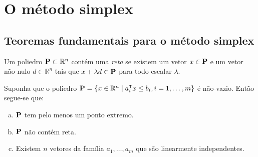 \section{O método simplex}\label{sec:metodo_simplex}
\subsection{Teoremas fundamentais para o método simplex}\label{sec:simplex pontos extremos}

\begin{mydef}[Reta]\label{def:reta}
Um poliedro $\vb P \subset \mathbb{R}^n$ contém uma \emph{reta} se existem um vetor $x \in \vb P$ e um vetor não-nulo $ d \in \mathbb{R}^n$ tais que $x + \lambda d \in \vb P$ para todo escalar $\lambda$.
\end{mydef}

\begin{theorem}\label{teo:retas}
    Suponha que o poliedro ${\vb P = \{x \in \mathbb{R}^n \mid a_i^\intercal x \leq b_i, i = 1,\ldots,m\}}$ é não-vazio. Então segue-se que:
    \begin{enumerate}[(a)]
    \item $\vb P$ tem pelo menos um ponto extremo.
    \item $\vb P$ não contém reta.
    \item Existem $n$ vetores da família $a_1,\ldots,a_m$ que são linearmente independentes.
    \end{enumerate}
\end{theorem}

